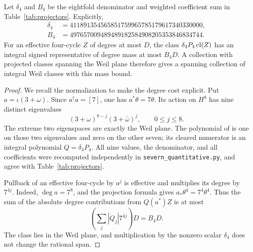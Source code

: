 \begin{proposition}\label{SQ8}
Let $\delta_4$ and $B_4$ be the eightfold denominator and weighted coefficient sum in Table~\ref{tab:projectors}. Explicitly,
\begin{align*}
 \delta_4&=411891354565851759965785179617340330000,\\
 B_4&=497657009489489182584908205353846834744.
\end{align*}
For an effective four-cycle $Z$ of degree at most $D$, the class $\delta_4P_4\operatorname{cl}(Z)$ has an integral signed representative of degree mass at most $B_4D$. A collection with projected classes spanning the Weil plane therefore gives a spanning collection of integral Weil classes with this mass bound.
\end{proposition}
\begin{proof}
We recall the normalization to make the degree cost explicit. Put $a=\iota(3+\omega)$. Since $a^\dagger a=[7]$, one has $a^*\theta=7\theta$. Its action on $H^8$ has nine distinct eigenvalues
\[
 (3+\omega)^{8-j}(3+\bar\omega)^j,\qquad 0\le j\le8.
\]
The extreme two eigenspaces are exactly the Weil plane. The polynomial of  is one on those two eigenvalues and zero on the other seven; its cleared numerator is an integral polynomial $Q=\delta_4P_4$. All nine values, the denominator, and all coefficients were recomputed independently in \texttt{severn\_quantitative.py}, and agree with Table~\ref{tab:projectors}.

Pullback of an effective four-cycle by $a^j$ is effective and multiplies its degree by $7^{4j}$. Indeed, $\deg a=7^8$, and the projection formula gives $a_*\theta^4=7^4\theta^4$. Thus the sum of the absolute degree contributions from $Q(a^*)Z$ is at most
\[
 \left(\sum_j|Q_j|7^{4j}\right)D=B_4D.
\]
The class lies in the Weil plane, and multiplication by the nonzero scalar $\delta_4$ does not change the rational span.
\end{proof}

